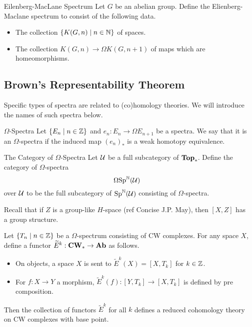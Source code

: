 \documentclass[a4paper]{article}
\begin{document}
\begin{defn}{Eilenberg-MacLane Spectrum}{} Let $G$ be an abelian group. Define the Elienberg-Maclane spectrum to consist of the following data. 
\begin{itemize}
\item The collection $\{K(G,n)\;|\;n\in\mathbb{N}\}$ of spaces. 
\item The collection $K(G,n)\to\Omega K(G,n+1)$ of maps which are homeomorphisms. 
\end{itemize}
\end{defn}

\subsection{Brown's Representability Theorem}
Specific types of spectra are related to (co)homology theories. We will introduce the names of such spectra below. 

\begin{defn}{$\Omega$-Spectra}{} Let $\{E_n\;|\;n\in\mathbb{Z}\}$ and $e_n:E_n\to\Omega E_{n+1}$ be a spectra. We say that it is an $\Omega$-spectra if the induced map $(e_n)_\ast$ is a weak homotopy equivalence. 
\end{defn}

\begin{defn}{The Category of $\Omega$-Spectra}{} Let $\mathcal{U}$ be a full subcategory of $\bold{Top}_\ast$. Define the category of $\Omega$-spectra $$\Omega\text{Sp}^{\mathbb{N}}(\mathcal{U})$$ over $\mathcal{U}$ to be the full subcategory of $\text{Sp}^{\mathbb{N}}(\mathcal{U})$ consisting of $\Omega$-spectra. 
\end{defn}

Recall that if $Z$ is a group-like $H$-space (ref Concise J.P. May), then $[X,Z]$ has a group structure. 

\begin{thm}{}{} Let $\{T_n\;|\;n\in\mathbb{Z}\}$ be a $\Omega$-spectrum consisting of CW complexes. For any space $X$, define a functor $\widetilde{E}^k:\bold{CW}_\ast\to\bold{Ab}$ as follows. 
\begin{itemize}
\item On objects, a space $X$ is sent to $\widetilde{E}^k(X)=[X,T_k]$ for $k\in\mathbb{Z}$.
\item For $f:X\to Y$ a morphism, $\widetilde{E}^k(f):[Y,T_k]\to[X,T_k]$ is defined by pre composition.
\end{itemize}
Then the collection of functors $\widetilde{E}^k$ for all $k$ defines a reduced cohomology theory on CW complexes with base point. 
\end{thm}
\end{document}
